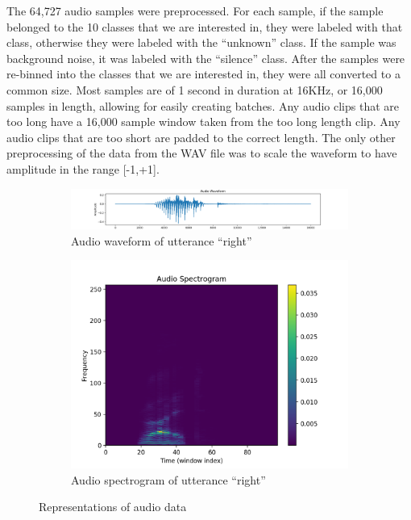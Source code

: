 \documentclass{article}
\begin{document}
The 64,727 audio samples were preprocessed. For each sample, if the
sample belonged to the 10 classes that we are interested in, they were
labeled with that class, otherwise they were labeled with the
``unknown'' class. If the sample was background noise, it was labeled
with the ``silence'' class. After the samples were re-binned into the
classes that we are interested in, they were all converted to a common
size. Most samples are of 1 second in duration at 16KHz, or 16,000
samples in length, allowing for easily creating batches. Any audio clips
that are too long have a 16,000 sample window taken from the too long
length clip. Any audio clips that are too short are padded to the correct
length. The only other preprocessing of the data from the WAV file was
to scale the waveform to have amplitude in the range [-1,+1].

\begin{figure}
  \begin{subfigure}{.45\textwidth}
    \includegraphics[width=\linewidth]{images/waveform-right}
    \caption{Audio waveform of utterance ``right''}
    \label{fig:wave_right}
  \end{subfigure}%
  \begin{subfigure}{.45\textwidth}
    \includegraphics[width=0.75\linewidth]{images/spectrogram-right}
    \caption{Audio spectrogram of utterance ``right''}
    \label{fig:spec_right}
  \end{subfigure}
  \caption{Representations of audio data}
\end{figure}
\end{document}
